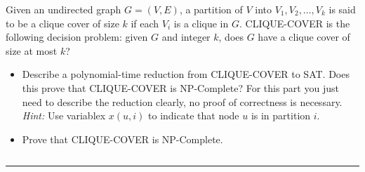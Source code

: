 \documentclass[11pt]{article}
\begin{document}

\item Given an undirected graph $G=(V,E)$, a partition of $V$
  into $V_1,V_2,\ldots,V_k$ is said to be a clique cover of size $k$
  if each $V_i$ is a clique in $G$. CLIQUE-COVER is the following
  decision problem: given $G$ and integer $k$, does $G$ have a clique
  cover of size at most $k$?
  \begin{itemize}
  \item Describe a polynomial-time reduction from CLIQUE-COVER to
    SAT. Does this prove that CLIQUE-COVER is NP-Complete? For this
    part you just need to describe the reduction clearly, no proof of
    correctness is necessary. {\em Hint:} Use variablex $x(u,i)$ to
    indicate that node $u$ is in partition $i$.
  \item Prove that CLIQUE-COVER is NP-Complete.
  \end{itemize}
 $$ $$
\hrule
\end{document}
